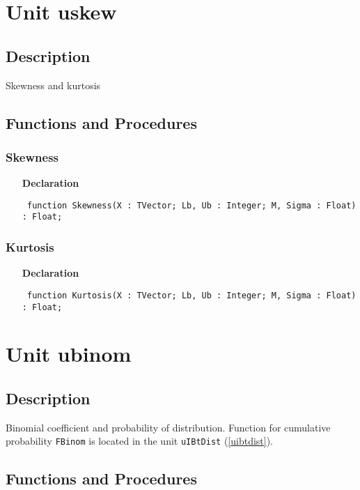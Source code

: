 \documentclass[12pt,a4paper,oneside]{report}
\newcommand{\declarationitem}[1]{\textbf{#1}}
\newcommand{\code}[1]{\texttt{#1}}
\begin{document}
\section{Unit uskew}
\label{uskew}
\subsection{Description}
Skewness and kurtosis
\subsection{Functions and Procedures}
\subsubsection{Skewness}
\label{uskew-Skewness}
\begin{itemize}\item[\declarationitem{Declaration}\hfill]
	\begin{flushleft}
		\code{
			function Skewness(X : TVector; Lb, Ub : Integer; M, Sigma : Float) : Float;}
	\end{flushleft}
\end{itemize}
\subsubsection{Kurtosis}
\label{uskew-Kurtosis}
\begin{itemize}\item[\declarationitem{Declaration}\hfill]
	\begin{flushleft}
		\code{
			function Kurtosis(X : TVector; Lb, Ub : Integer; M, Sigma : Float) : Float;}
	\end{flushleft}
\end{itemize}
\section{Unit ubinom}
\label{ubinom}
\subsection{Description}
Binomial coefficient and probability of distribution. Function for cumulative probability \code{FBinom} is located in the unit \code{uIBtDist} (\ref{uibtdist}).  
\subsection{Functions and Procedures}
\end{document}
